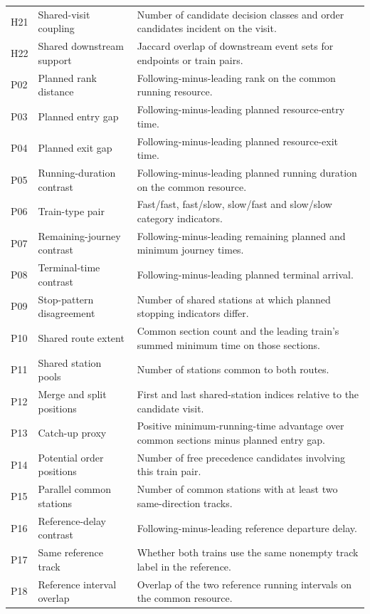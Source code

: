 \begin{longtable}{@{}>{\raggedright\arraybackslash}p{0.8cm}>{\raggedright\arraybackslash}p{3.7cm}>{\raggedright\arraybackslash}p{10.0cm}@{}}
H21 & Shared-visit coupling & Number of candidate decision classes and order candidates incident on the visit. \\
H22 & Shared downstream support & Jaccard overlap of downstream event sets for endpoints or train pairs. \\
P02 & Planned rank distance & Following-minus-leading rank on the common running resource. \\
P03 & Planned entry gap & Following-minus-leading planned resource-entry time. \\
P04 & Planned exit gap & Following-minus-leading planned resource-exit time. \\
P05 & Running-duration contrast & Following-minus-leading planned running duration on the common resource. \\
P06 & Train-type pair & Fast/fast, fast/slow, slow/fast and slow/slow category indicators. \\
P07 & Remaining-journey contrast & Following-minus-leading remaining planned and minimum journey times. \\
P08 & Terminal-time contrast & Following-minus-leading planned terminal arrival. \\
P09 & Stop-pattern disagreement & Number of shared stations at which planned stopping indicators differ. \\
P10 & Shared route extent & Common section count and the leading train's summed minimum time on those sections. \\
P11 & Shared station pools & Number of stations common to both routes. \\
P12 & Merge and split positions & First and last shared-station indices relative to the candidate visit. \\
P13 & Catch-up proxy & Positive minimum-running-time advantage over common sections minus planned entry gap. \\
P14 & Potential order positions & Number of free precedence candidates involving this train pair. \\
P15 & Parallel common stations & Number of common stations with at least two same-direction tracks. \\
P16 & Reference-delay contrast & Following-minus-leading reference departure delay. \\
P17 & Same reference track & Whether both trains use the same nonempty track label in the reference. \\
P18 & Reference interval overlap & Overlap of the two reference running intervals on the common resource. \\

\end{longtable}
